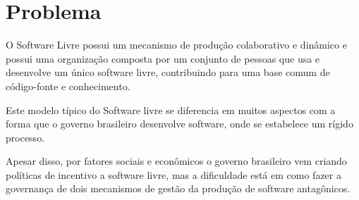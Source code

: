 
\chapter[Problema]{Problema}

O Software Livre possui um mecanismo de produção colaborativo e dinâmico 
e possui uma organização composta por um conjunto de pessoas que usa e desenvolve 
um único software livre, contribuindo para uma base comum de código-fonte e 
conhecimento.\cite{reis2003caracterizacc}

Este modelo típico do Software livre se diferencia em muitos aspectos com a forma
que o governo brasileiro desenvolve software, onde se estabelece um rígido processo.

Apesar disso, por fatores sociais e econômicos o governo brasileiro vem
criando políticas de incentivo a software livre, mas a dificuldade está em como
fazer a governança de dois mecanismos de gestão da produção de software antagônicos. 	


